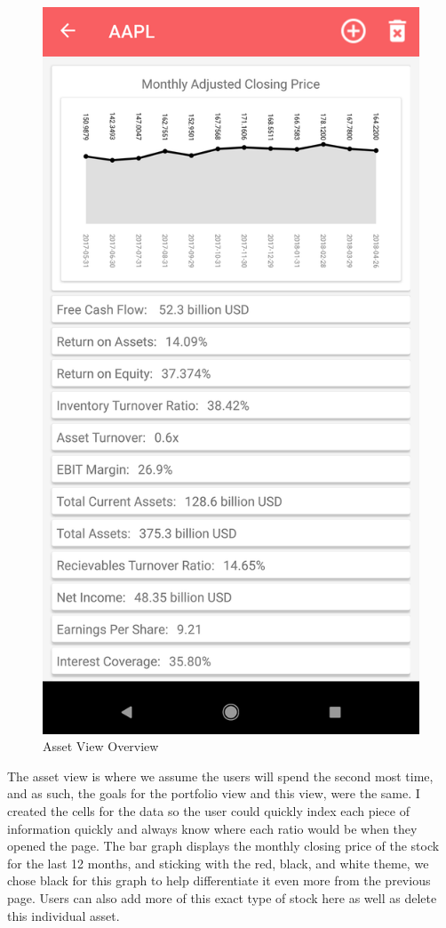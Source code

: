 \documentclass[letterpaper,10pt,titlepage,journal,compsoc,draftclsnofoot,onecolumn]{IEEEtran}
\begin{document}
\begin{figure}[h]
   \caption{Asset View Overview}
   \centering
   \includegraphics[scale=.15]{spring_asset_screenshot}
\end{figure}

The asset view is where we assume the users will spend the second most time, and as such, the goals for the portfolio view and this view, were the same. I created the cells for the data so the user could quickly index each piece of information quickly and always know where each ratio would be when they opened the page. The bar graph displays the monthly closing price of the stock for the last 12 months, and sticking with the red, black, and white theme, we chose black for this graph to help differentiate it even more from the previous page. Users can also add more of this exact type of stock here as well as delete this individual asset.
\end{document}
